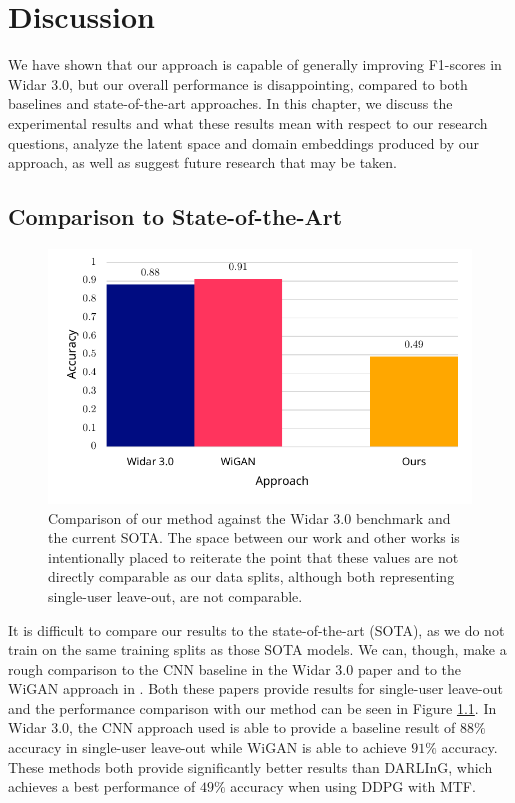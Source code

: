 \chapter{Discussion}

We have shown that our approach is capable of generally improving F1-scores in Widar 3.0, but our overall performance is disappointing, compared to both baselines and state-of-the-art approaches.
In this chapter, we discuss the experimental results and what these results mean with respect to our research questions, analyze the latent space and domain embeddings produced by our approach, as well as suggest future research that may be taken.

\section{Comparison to State-of-the-Art}

\begin{figure}
	\centering
	\includegraphics[width=5in]{figures/results_sota}
	\caption{Comparison of our method against the Widar 3.0 benchmark and the current SOTA. The space between our work and other works is intentionally placed to reiterate the point that these values are not directly comparable as our data splits, although both representing single-user leave-out, are not comparable.}
	\label{fig:results-sota}
\end{figure}

It is difficult to compare our results to the state-of-the-art (SOTA), as we do not train on the same training splits as those SOTA models.
We can, though, make a rough comparison to the CNN baseline in the Widar 3.0 paper \cite{zheng2019zero} and to the WiGAN approach in \cite{jiang2020wigan}.
Both these papers provide results for single-user leave-out and the performance comparison with our method can be seen in Figure \ref{fig:results-sota}.
In Widar 3.0, the CNN approach used is able to provide a baseline result of $88\%$ accuracy in single-user leave-out while 
WiGAN is able to achieve $91\%$ accuracy.
These methods both provide significantly better results than DARLInG, which achieves a best performance of $49\%$ accuracy when using DDPG with MTF.

